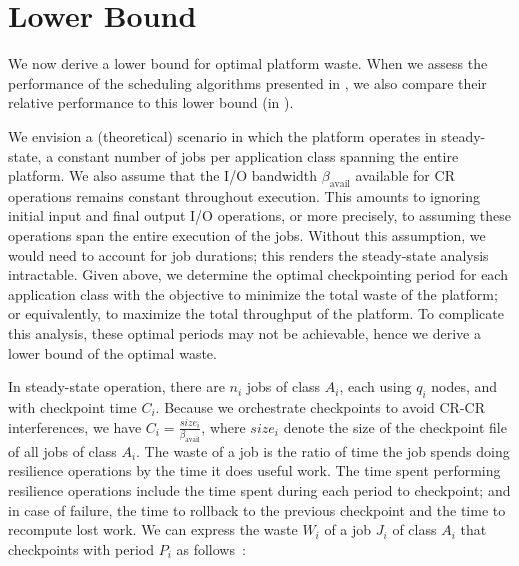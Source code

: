 \documentclass[two]{article}
\newcommand{\bandavail}{\beta_{\text{avail}}}
\newcommand{\app}[1]{A_{#1}}
\newcommand{\nbapp}[1]{n_{#1}}
\newcommand{\nbnodes}[1]{q_{#1}}
\newcommand{\period}[1]{P_{#1}}
\newcommand{\ckpt}[1]{C_{#1}}
\newcommand{\reco}[1]{R_{#1}}
\newcommand{\size}[1]{\mathit{size}_{#1}}
\newcommand{\wasteapp}[1]{W_{#1}}
\begin{document}
%

\section{Lower Bound}
\label{sec:lowerbound}

We now derive a lower bound for optimal platform waste.  When we assess the
performance of the scheduling algorithms presented in , we
also compare their relative performance to this lower bound (in
).

We envision a (theoretical) scenario in which the platform operates in
steady-state, a constant number of jobs per application class spanning the
entire platform.  We also assume that the I/O bandwidth $\bandavail$ available
for CR operations remains constant throughout execution. This amounts to
ignoring initial input and final output I/O operations, or more precisely, to
assuming these operations span the entire execution of the jobs.  Without this
assumption, we would need to account for job durations; this renders the
steady-state analysis intractable.  Given above, we determine the optimal
checkpointing period for each application class with the objective to minimize
the total waste of the platform; or equivalently, to maximize the total
throughput of the platform. To complicate this analysis, these optimal periods
may not be achievable, hence we derive a lower bound of the optimal waste.

In steady-state operation, there are $\nbapp{i}$ jobs of class $\app{i}$, each
using $\nbnodes{i}$ nodes, and with checkpoint time $\ckpt{i}$. Because we
orchestrate checkpoints to avoid CR-CR interferences, we have $\ckpt{i} =
\frac{\size{i}}{\bandavail}$, where $\size{i}$ denote the size of the
checkpoint file of all jobs of class $\app{i}$.  The waste of a job is the
ratio of time the job spends doing resilience operations by the time it does
useful work. The time spent performing resilience operations include the time spent
during each period to checkpoint; and in case of failure, the time to rollback
to the previous checkpoint and the time to recompute lost work.
We can express the waste $\wasteapp{i}$ of a job $J_{i}$ of class $\app{i}$
that checkpoints with period $\period{i}$ as follows~\cite{springer-monograph}:
\end{document}
